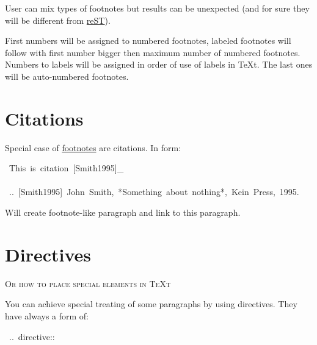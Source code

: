 \documentclass[12pt]{article}
\newcommand{\subtitle}[1]{{\large\textsc{#1}}\vskip15pt}
\begin{document}
User can mix types of footnotes but results can be unexpected (and for sure
they will be different from \href{http://docutils.sf.net}{reST}).

First numbers will be assigned to numbered footnotes, labeled footnotes will
follow with first number bigger then maximum number of numbered footnotes.
Numbers to labels will be assigned in order of use of labels in \TeX{}t. The last
ones will be auto-numbered footnotes.

\begin{center}
\end{center}
\hypertarget{lcitations}{}
\section{Citations}

Special case of \href{\#lfootnotes}{footnotes} are citations. In form:

\begin{ttfamily}\begin{flushleft}
\mbox{~This~is~citation~[Smith1995]\_}\\
\mbox{}\\
\mbox{~..~[Smith1995]~John~Smith,~*Something~about~nothing*,~Kein~Press,~1995.}\\
\end{flushleft}\end{ttfamily}

Will create footnote-like paragraph and link to this paragraph.

\hypertarget{ldirectives}{}
\section{Directives}

\subtitle{Or how to place special elements in \TeX{}t
}

You can achieve special treating of some paragraphs by using
directives. They have always a form of:

\begin{ttfamily}\begin{flushleft}
\mbox{~..~directive::}\\
\end{flushleft}\end{ttfamily}
\end{document}
